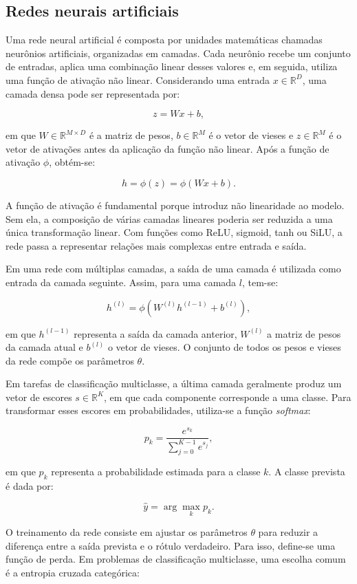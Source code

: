 \documentclass[
    12pt,
    openright,
    oneside,
    a4paper,
    english,
    brazil
]{abntex2}
\begin{document}
\subsection{Redes neurais artificiais}

Uma rede neural artificial é composta por unidades matemáticas chamadas neurônios artificiais, organizadas em camadas. Cada neurônio recebe um conjunto de entradas, aplica uma combinação linear desses valores e, em seguida, utiliza uma função de ativação não linear. Considerando uma entrada \(x \in \mathbb{R}^{D}\), uma camada densa pode ser representada por:

\[
z = Wx + b,
\]

em que \(W \in \mathbb{R}^{M \times D}\) é a matriz de pesos, \(b \in \mathbb{R}^{M}\) é o vetor de vieses e \(z \in \mathbb{R}^{M}\) é o vetor de ativações antes da aplicação da função não linear. Após a função de ativação \(\phi\), obtém-se:

\[
h = \phi(z) = \phi(Wx + b).
\]

A função de ativação é fundamental porque introduz não linearidade ao modelo. Sem ela, a composição de várias camadas lineares poderia ser reduzida a uma única transformação linear. Com funções como ReLU, sigmoid, tanh ou SiLU, a rede passa a representar relações mais complexas entre entrada e saída.

Em uma rede com múltiplas camadas, a saída de uma camada é utilizada como entrada da camada seguinte. Assim, para uma camada \(l\), tem-se:

\[
h^{(l)} = \phi\left(W^{(l)}h^{(l-1)} + b^{(l)}\right),
\]

em que \(h^{(l-1)}\) representa a saída da camada anterior, \(W^{(l)}\) a matriz de pesos da camada atual e \(b^{(l)}\) o vetor de vieses. O conjunto de todos os pesos e vieses da rede compõe os parâmetros \(\theta\).

Em tarefas de classificação multiclasse, a última camada geralmente produz um vetor de escores \(s \in \mathbb{R}^{K}\), em que cada componente corresponde a uma classe. Para transformar esses escores em probabilidades, utiliza-se a função \textit{softmax}:

\[
p_k =
\frac{e^{s_k}}
{\sum_{j=0}^{K-1} e^{s_j}},
\]

em que \(p_k\) representa a probabilidade estimada para a classe \(k\). A classe prevista é dada por:

\[
\hat{y} = \arg\max_k p_k.
\]

O treinamento da rede consiste em ajustar os parâmetros \(\theta\) para reduzir a diferença entre a saída prevista e o rótulo verdadeiro. Para isso, define-se uma função de perda. Em problemas de classificação multiclasse, uma escolha comum é a entropia cruzada categórica:
\end{document}
